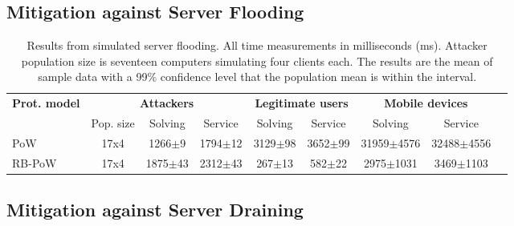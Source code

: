 \subsection{Mitigation against Server Flooding}
  \begin{table}[H]
    \centering
    \tiny
    \caption{Results from simulated server flooding. All time measurements in milliseconds (ms). Attacker population size is seventeen computers simulating four clients each. The results are the mean of sample data with a 99\% confidence level that the population mean is within the interval. }\label{tab:flooding}

    \begin{tabularx}{1.05\textwidth}{lcccccccr} \toprule
      \multicolumn{1}{c}{\textbf{Prot. model}} & \multicolumn{3}{c}{\textbf{Attackers}} & \multicolumn{2}{c}{\textbf{Legitimate users}} & \multicolumn{2}{c}{\textbf{Mobile devices}} \\
      \multicolumn{1}{c}{} & \multicolumn{1}{c}{Pop. size} & \multicolumn{1}{c}{Solving} & \multicolumn{1}{c}{Service} & \multicolumn{1}{c}{Solving} & \multicolumn{1}{c}{Service} & \multicolumn{1}{c}{Solving} & \multicolumn{1}{c}{Service}  \\ \toprule
      PoW & 17x4  & 1266$\pm$9 & 1794$\pm$12 & 3129$\pm$98 & 3652$\pm$99 & 31959$\pm$4576 & 32488$\pm$4556    \\
      RB-PoW & 17x4 & 1875$\pm$43 & 2312$\pm$43 & 267$\pm$13 & 582$\pm$22 & 2975$\pm$1031 & 3469$\pm$1103   \\ \bottomrule
    \end{tabularx}

  \end{table}


\subsection{Mitigation against Server Draining}

